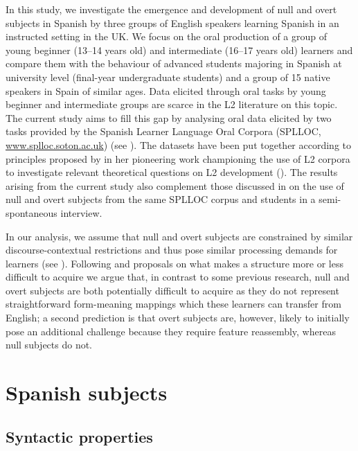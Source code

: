 \documentclass[output=paper]{langscibook}
\begin{document}
In this study, we investigate the emergence and development of null and overt subjects in Spanish by three groups of English speakers learning Spanish in an instructed setting in the UK. We focus on the oral production of a group of young beginner (13--14 years old) and intermediate (16--17 years old) learners and compare them with the behaviour of advanced students majoring in Spanish at university level (final-year undergraduate students) and a group of 15 native speakers in Spain of similar ages. Data elicited through oral tasks by young beginner and intermediate groups are scarce in the L2 literature on this topic. The current study aims to fill this gap by analysing oral data elicited by two tasks provided by the Spanish Learner Language Oral Corpora (SPLLOC, \href{http://www.splloc.soton.ac.uk}{{www.splloc.soton.ac.uk}}) (see \citealt{MitchellEtAl2008}). The datasets have been put together according to principles proposed by \citet{Myles2005} in her pioneering work championing the use of L2 corpora to investigate relevant theoretical questions on L2 development (\citealt{Myles2004,Myles2005, Myles2007}). The results arising from the current study also complement those discussed in \citet{Dominguez2013} on the use of null and overt subjects from the same SPLLOC corpus and students in a semi-spontaneous interview.

In our analysis, we assume that null and overt subjects are constrained by similar discourse-contextual restrictions and thus pose similar processing demands for learners (see \citealt{Dominguez2013}). Following  and  proposals on what makes a structure more or less difficult to acquire we argue that, in contrast to some previous research, null and overt subjects are both potentially difficult to acquire as they do not represent straightforward form-meaning mappings which these learners can transfer from English; a second prediction is that overt subjects are, however, likely to initially pose an additional challenge because they require feature reassembly, whereas null subjects do not.

\section{Spanish subjects}\label{sec:dominguez:2}
\subsection{Syntactic properties}
\end{document}

